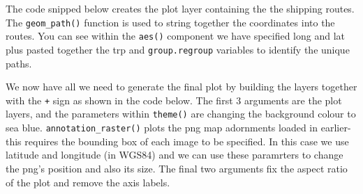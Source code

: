 \documentclass[]{article}
\newenvironment{Shaded}{}{}
\newcommand{\KeywordTok}[1]{\textcolor[rgb]{0.00,0.44,0.13}{\textbf{{#1}}}}
\newcommand{\DataTypeTok}[1]{\textcolor[rgb]{0.56,0.13,0.00}{{#1}}}
\newcommand{\FloatTok}[1]{\textcolor[rgb]{0.25,0.63,0.44}{{#1}}}
\newcommand{\StringTok}[1]{\textcolor[rgb]{0.25,0.44,0.63}{{#1}}}
\newcommand{\NormalTok}[1]{{#1}}
\begin{document}
The code snipped below creates the plot layer containing the the
shipping routes. The \texttt{geom\_path()} function is used to string
together the coordinates into the routes. You can see within the
\texttt{aes()} component we have specified long and lat plus pasted
together the trp and \texttt{group.regroup} variables to identify the
unique paths.

\begin{Shaded}
\end{Shaded}
We now have all we need to generate the final plot by building the
layers together with the \texttt{+} sign as shown in the code below. The
first 3 arguments are the plot layers, and the parameters within
\texttt{theme()} are changing the background colour to sea blue.
\texttt{annotation\_raster()} plots the png map adornments loaded in
earlier- this requires the bounding box of each image to be specified.
In this case we use latitude and longitude (in WGS84) and we can use
these paramrters to change the png's position and also its size. The
final two arguments fix the aspect ratio of the plot and remove the axis
labels.
\end{document}
